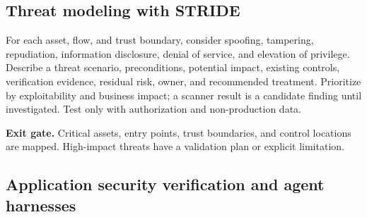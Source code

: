 \documentclass[11pt,letterpaper]{article}
\newcommand{\gate}[1]{\par\noindent\colorbox{pale}{\parbox{\dimexpr\linewidth-2\fboxsep\relax}{\textbf{\color{teal}Exit gate.} #1}}\par}
\begin{document}
\subsection{Threat modeling with STRIDE}
For each asset, flow, and trust boundary, consider spoofing, tampering, repudiation, information disclosure, denial of service, and elevation of privilege. Describe a threat scenario, preconditions, potential impact, existing controls, verification evidence, residual risk, owner, and recommended treatment. Prioritize by exploitability and business impact; a scanner result is a candidate finding until investigated. Test only with authorization and non-production data.
\gate{Critical assets, entry points, trust boundaries, and control locations are mapped. High-impact threats have a validation plan or explicit limitation.}
\clearpage
\subsection{Application security verification and agent harnesses}
\end{document}
